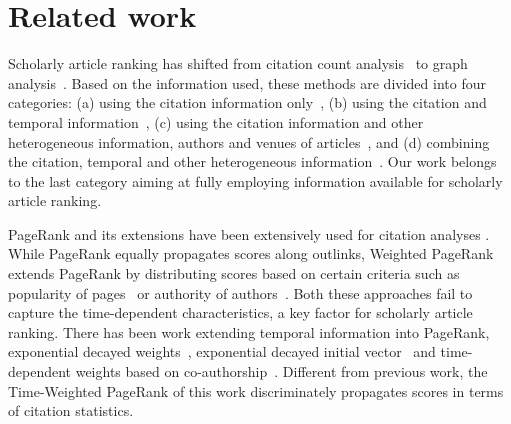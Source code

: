 
\section{Related work} \label{sec-related}



Scholarly article ranking has shifted from citation count analysis~\cite{Garfield471,Hirsch15112005} to graph analysis~\cite{ChenXMR07,Zhou07-CoRank,Jiang12-MRank,Liang16AAAI,Li08TSRanking,Wang13AAAI,WalkerXKM07,sayyadi09,
Wang16TIST,Ng11KDD}.
Based on the information used, these methods are divided into four categories: (a) using the citation information only~\cite{Garfield471,Hirsch15112005,ChenXMR07,Ng11KDD}, (b) using the citation and temporal information~\cite{Li08TSRanking,WalkerXKM07}, (c) using the citation information and other heterogeneous information, \eg authors and venues of articles~\cite{Zhou07-CoRank,Jiang12-MRank,Liang16AAAI}, and (d) combining the citation, temporal and other heterogeneous information~\cite{sayyadi09,Wang16TIST,Wang13AAAI}.
Our work belongs to the last category aiming at fully employing information available for scholarly article ranking.
%




PageRank \cite{Brin98:PageRank} and its extensions have been extensively used for citation analyses \cite{Waltman2014}. While PageRank equally propagates scores along outlinks, Weighted PageRank extends PageRank by distributing scores based on certain criteria such as popularity of pages~\cite{Xing04:WPR} or authority of authors~\cite{Ding11}. Both these approaches fail to capture the time-dependent characteristics, a key factor for scholarly article ranking. There has been work extending temporal information into PageRank, \eg exponential decayed weights~\cite{Li08TSRanking}, exponential decayed initial vector~\cite{WalkerXKM07} and time-dependent weights based on co-authorship~\cite{FIALA2012370}. Different from previous work, the Time-Weighted PageRank of this work discriminately propagates scores in terms of citation statistics.






